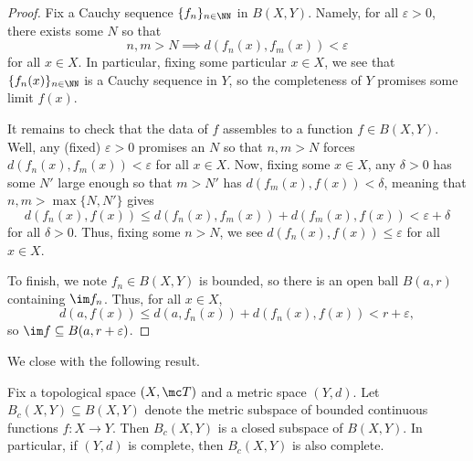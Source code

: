 \documentclass[../notes.tex]{subfiles}
\begin{document}
\begin{proof}
	Fix a Cauchy sequence $\{f_n\}_{n\in\NN}$ in $B(X,Y)$. Namely, for all $\varepsilon>0$, there exists some $N$ so that
	\[n,m>N\implies d(f_n(x),f_m(x))<\varepsilon\]
	for all $x\in X$. In particular, fixing some particular $x\in X$, we see that $\{f_n(x)\}_{n\in\NN}$ is a Cauchy sequence in $Y$, so the completeness of $Y$ promises some limit $f(x)$.

	It remains to check that the data of $f$ assembles to a function $f\in B(X,Y)$. Well, any (fixed) $\varepsilon>0$ promises an $N$ so that $n,m>N$ forces $d(f_n(x),f_m(x))<\varepsilon$ for all $x\in X$. Now, fixing some $x\in X$, any $\delta>0$ has some $N'$ large enough so that $m>N'$ has $d(f_m(x),f(x))<\delta$, meaning that $n,m>\max\{N,N'\}$ gives
	\[d(f_n(x),f(x))\le d(f_n(x),f_m(x))+d(f_m(x),f(x))<\varepsilon+\delta\]
	for all $\delta>0$. Thus, fixing some $n>N$, we see $d(f_n(x),f(x))\le\varepsilon$ for all $x\in X$.

	To finish, we note $f_n\in B(X,Y)$ is bounded, so there is an open ball $B(a,r)$ containing $\im f_n$. Thus, for all $x\in X$,
	\[d(a,f(x))\le d(a,f_n(x))+d(f_n(x),f(x))<r+\varepsilon,\]
	so $\im f\subseteq B(a,r+\varepsilon)$.
\end{proof}
We close with the following result.
\begin{proposition}
	Fix a topological space $(X,\mc T)$ and a metric space $(Y,d)$. Let $B_c(X,Y)\subseteq B(X,Y)$ denote the metric subspace of bounded continuous functions $f\colon X\to Y$. Then $B_c(X,Y)$ is a closed subspace of $B(X,Y)$. In particular, if $(Y,d)$ is complete, then $B_c(X,Y)$ is also complete.
\end{proposition}
\end{document}
